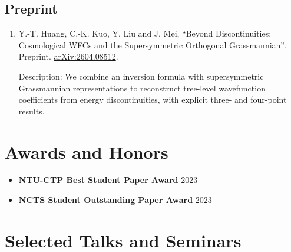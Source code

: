 \documentclass[10pt,a4paper]{article}
\newcommand{\cvdate}[1]{\hfill{\color{muted}#1}}
\newcommand{\publication}[4]{\item #1, ``#2'', #3. \href{https://arxiv.org/abs/#4}{arXiv:#4}.}
\newcommand{\pubdescription}[1]{{\small\color{muted}Description: #1}}
\begin{document}
\subsection*{Preprint}

\begin{enumerate}
  \publication{Y.-T. Huang, C.-K. Kuo, Y. Liu and J. Mei}{Beyond Discontinuities: Cosmological WFCs and the Supersymmetric Orthogonal Grassmannian}{Preprint}{2604.08512}

  \pubdescription{We combine an inversion formula with supersymmetric Grassmannian representations to reconstruct tree-level wavefunction coefficients from energy discontinuities, with explicit three- and four-point results.}
\end{enumerate}

\section{Awards and Honors}

\begin{itemize}
  \item \textbf{NTU-CTP Best Student Paper Award} \cvdate{2023}
  \item \textbf{NCTS Student Outstanding Paper Award} \cvdate{2023}
\end{itemize}

\section{Selected Talks and Seminars}
\end{document}
